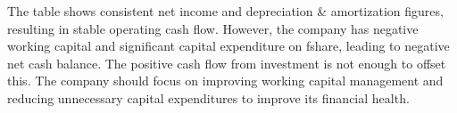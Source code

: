 The table shows consistent net income and depreciation & amortization figures, resulting in stable operating cash flow. However, the company has negative working capital and significant capital expenditure on fshare, leading to negative net cash balance. The positive cash flow from investment is not enough to offset this. The company should focus on improving working capital management and reducing unnecessary capital expenditures to improve its financial health.